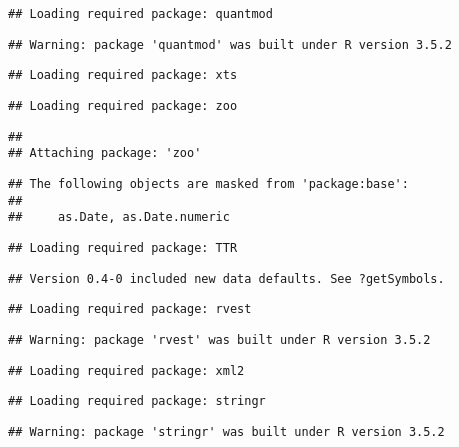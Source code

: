 \documentclass[]{article}
\begin{document}
\begin{verbatim}
## Loading required package: quantmod
\end{verbatim}

\begin{verbatim}
## Warning: package 'quantmod' was built under R version 3.5.2
\end{verbatim}

\begin{verbatim}
## Loading required package: xts
\end{verbatim}

\begin{verbatim}
## Loading required package: zoo
\end{verbatim}

\begin{verbatim}
## 
## Attaching package: 'zoo'
\end{verbatim}

\begin{verbatim}
## The following objects are masked from 'package:base':
## 
##     as.Date, as.Date.numeric
\end{verbatim}

\begin{verbatim}
## Loading required package: TTR
\end{verbatim}

\begin{verbatim}
## Version 0.4-0 included new data defaults. See ?getSymbols.
\end{verbatim}

\begin{verbatim}
## Loading required package: rvest
\end{verbatim}

\begin{verbatim}
## Warning: package 'rvest' was built under R version 3.5.2
\end{verbatim}

\begin{verbatim}
## Loading required package: xml2
\end{verbatim}

\begin{verbatim}
## Loading required package: stringr
\end{verbatim}

\begin{verbatim}
## Warning: package 'stringr' was built under R version 3.5.2
\end{verbatim}
\end{document}

